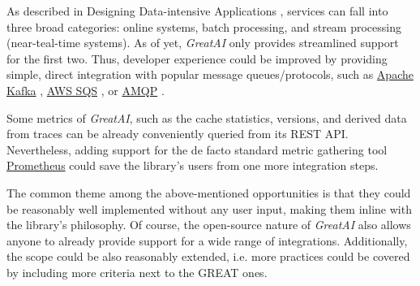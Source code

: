 As described in Designing Data-intensive Applications \cite{kleppmann2017designing}, services can fall into three broad categories: online systems, batch processing, and stream processing (near-teal-time systems). As of yet, \textit{GreatAI} only provides streamlined support for the first two. Thus, developer experience could be improved by providing simple, direct integration with popular message queues/protocols, such as \href{https://kafka.apache.org/}{Apache Kafka} \cite{kreps2011kafka}, \href{https://aws.amazon.com/sqs/}{AWS SQS} \cite{garfinkel2007evaluation}, or \href{https://www.amqp.org/}{AMQP} \cite{vinoski2006advanced}.

Some metrics of \textit{GreatAI}, such as the cache statistics, versions, and derived data from traces can be already conveniently queried from its REST API. Nevertheless, adding support for the de facto standard metric gathering tool \href{https://prometheus.io/}{Prometheus} could save the library's users from one more integration steps.

The common theme among the above-mentioned opportunities is that they could be reasonably well implemented without any user input, making them inline with the library's philosophy. Of course, the open-source nature of \textit{GreatAI} also allows anyone to already provide support for a wide range of integrations. Additionally, the scope could be also reasonably extended, i.e. more practices could be covered by including more criteria next to the GREAT ones.
